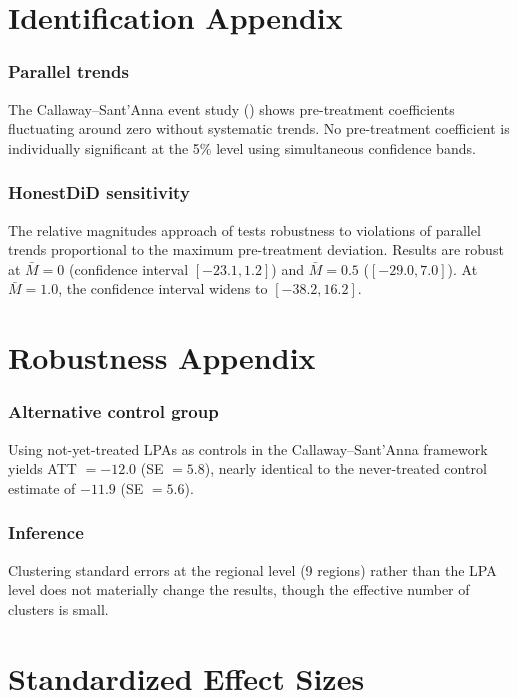 \documentclass[12pt]{article}
\begin{document}
\section{Identification Appendix}

\subsubsection*{Parallel trends} The Callaway--Sant'Anna event study () shows pre-treatment coefficients fluctuating around zero without systematic trends. No pre-treatment coefficient is individually significant at the 5\% level using simultaneous confidence bands.

\subsubsection*{HonestDiD sensitivity} The relative magnitudes approach of \citet{RambachanRoth2023} tests robustness to violations of parallel trends proportional to the maximum pre-treatment deviation. Results are robust at $\bar{M} = 0$ (confidence interval $[-23.1, 1.2]$) and $\bar{M} = 0.5$ ($[-29.0, 7.0]$). At $\bar{M} = 1.0$, the confidence interval widens to $[-38.2, 16.2]$.

\section{Robustness Appendix}

\subsubsection*{Alternative control group} Using not-yet-treated LPAs as controls in the Callaway--Sant'Anna framework yields ATT $= -12.0$ (SE $= 5.8$), nearly identical to the never-treated control estimate of $-11.9$ (SE $= 5.6$).

\subsubsection*{Inference} Clustering standard errors at the regional level (9 regions) rather than the LPA level does not materially change the results, though the effective number of clusters is small.

\section{Standardized Effect Sizes}
\label{sec:sde}


\end{document}
